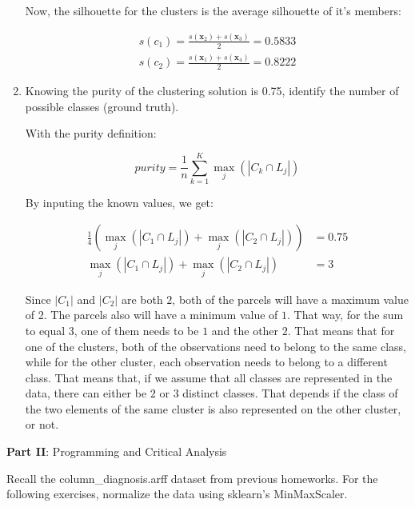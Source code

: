 \documentclass[12pt]{article}
\begin{document}
\begin{enumerate}[leftmargin=\labelsep]
    Now, the silhouette for the clusters is the average silhouette of it's members:

    \begin{equation}
    \begin{aligned}
        s(c_1) = \frac{s(\mathbf{x}_2) + s(\mathbf{x}_3)}{2} = 0.5833 \\
        s(c_2) = \frac{s(\mathbf{x}_1) + s(\mathbf{x}_4)}{2} = 0.8222
    \end{aligned}
    \end{equation}

    \item Knowing the purity of the clustering solution is 0.75, identify the number of possible classes
    (ground truth).

    With the purity definition:

    \begin{equation}
        purity = \frac{1}{n} \sum_{k=1}^{K} \max_j(|C_k \cap L_j|)
    \end{equation}

    By inputing the known values, we get:

    \begin{equation}
    \begin{aligned}
        \frac{1}{4}(\max_j(|C_1 \cap L_j|) + \max_j(|C_2 \cap L_j|)) &= 0.75 \\
        \max_j(|C_1 \cap L_j|) + \max_j(|C_2 \cap L_j|) &= 3
    \end{aligned}
    \end{equation}

    Since $|C_1|$ and $|C_2|$ are both $2$, both of the parcels will have a maximum value of 2. The parcels also will have a minimum value of $1$. That way, for the sum to equal $3$, one of them needs to be $1$ and the other $2$. That means that for one of the clusters, both of the observations need to belong to the same class, while for the other cluster, each observation needs to belong to a different class. That means that, if we assume that all classes are represented in the data, there can either be $2$ or $3$ distinct classes. That depends if the class of the two elements of the same cluster is also represented on the other cluster, or not.
\end{enumerate}

\vskip 10cm

\large{\textbf{Part II}: Programming and Critical Analysis}\normalsize

Recall the column\_diagnosis.arff dataset from previous homeworks. For the following exercises,
normalize the data using sklearn's MinMaxScaler.
\end{document}

